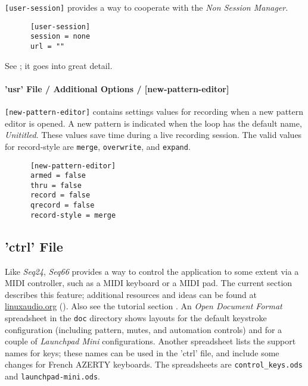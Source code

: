    \texttt{[user-session]} provides a way to cooperate with the
   \textsl{Non Session Manager}.

   \begin{verbatim}
      [user-session]
      session = none
      url = ""
   \end{verbatim}

   See ; it goes into great
   detail.

\paragraph{'usr' File / Additional Options / [new-pattern-editor]}
\label{paragraph:user_file_added_options_pattern_editor}

   \texttt{[new-pattern-editor]} contains settings values for recording
	 when a new pattern editor is opened. A new pattern is indicated when
	the loop has the default name, \textsl{Unititled}.
 	These values save time during a live recording session.
   The valid values for record-style are \texttt{merge},
 	\texttt{overwrite}, and \texttt{expand}.

   \begin{verbatim}
      [new-pattern-editor]
      armed = false
      thru = false
      record = false
      qrecord = false
      record-style = merge
   \end{verbatim}

\subsection{'ctrl' File}
\label{subsec:configuration_ctrl}

   Like \textsl{Seq24}, \textsl{Seq66} provides a way to control the
   application to some extent via a MIDI controller, such as a MIDI keyboard or
   a MIDI pad.  The current section describes this feature;
   additional resources and ideas can be found at \url{linuxaudio.org}
   (\cite{midicontrol}).
   Also see the tutorial section .
   An \textsl{Open Document Format} spreadsheet in the
   \texttt{doc} directory shows layouts for the default
   keystroke configuration (including pattern, mutes, and automation controls)
   and for a couple of \textsl{Launchpad Mini} configurations.
   Another spreadsheet lists the support names for keys; these names can be used
   in the 'ctrl' file, and include some changes for French AZERTY keyboards.
   The spreadsheets are
   \texttt{control\_keys.ods} and
   \texttt{launchpad-mini.ods}.

